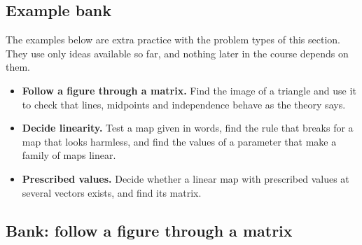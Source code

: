 \documentclass[11pt]{article}
\begin{document}
\subsection*{Example bank}

The examples below are extra practice with the problem types of this section. They use only ideas available so far, and nothing later in the course depends on them.

\begin{remark}
\begin{itemize}
  \item \textbf{Follow a figure through a matrix.} Find the image of a triangle and use it to check that lines, midpoints and independence behave as the theory says.
  \item \textbf{Decide linearity.} Test a map given in words, find the rule that breaks for a map that looks harmless, and find the values of a parameter that make a family of maps linear.
  \item \textbf{Prescribed values.} Decide whether a linear map with prescribed values at several vectors exists, and find its matrix.
\end{itemize}
\end{remark}

\subsection*{Bank: follow a figure through a matrix}
\end{document}
